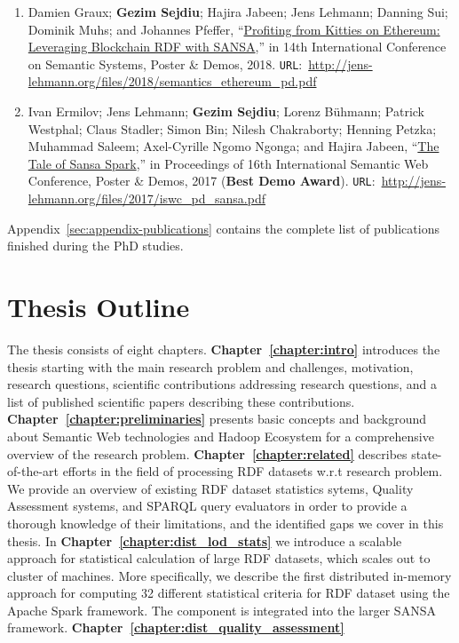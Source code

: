 \begin{itemize}
\begin{enumerate}
    \item Damien Graux; \textbf{Gezim Sejdiu}; Hajira Jabeen; Jens Lehmann; Danning Sui; Dominik Muhs; and Johannes Pfeffer, “\href{http://jens-lehmann.org/files/2018/semantics_ethereum_pd.pdf}{Profiting from Kitties on Ethereum: Leveraging Blockchain RDF with SANSA},” in 14th International Conference on Semantic Systems, Poster \& Demos, 2018. \texttt{URL}:~\url{http://jens-lehmann.org/files/2018/semantics_ethereum_pd.pdf}
    
    \item Ivan Ermilov; Jens Lehmann; \textbf{Gezim Sejdiu}; Lorenz Bühmann; Patrick Westphal; Claus Stadler; Simon Bin; Nilesh Chakraborty; Henning Petzka; Muhammad Saleem; Axel-Cyrille Ngomo Ngonga; and Hajira Jabeen, “\href{http://jens-lehmann.org/files/2017/iswc_pd_sansa.pdf}{The Tale of Sansa Spark},” in Proceedings of 16th International Semantic Web Conference, Poster \& Demos, 2017 ({\color{darkred}\textbf{Best Demo Award}}). \texttt{URL}:~\url{http://jens-lehmann.org/files/2017/iswc_pd_sansa.pdf}
        
    \end{enumerate}
\end{itemize}

Appendix~\ref{sec:appendix-publications} contains the complete list of publications finished during the PhD studies.

\section{Thesis Outline}
\label{sec:thesis-structure}
The thesis consists of eight chapters. 
\textbf{Chapter~\ref{chapter:intro}} introduces the thesis starting with the main research problem and challenges, motivation, research questions, scientific contributions addressing research questions, and a list of published scientific papers describing these contributions.
\textbf{Chapter~\ref{chapter:preliminaries}} presents basic concepts and background about Semantic Web technologies and Hadoop Ecosystem for a comprehensive overview of the research problem. 
\textbf{Chapter~\ref{chapter:related}} describes state-of-the-art efforts in the field of processing \gls{RDF} datasets w.r.t research problem.
We provide an overview of existing RDF dataset statistics sytems, Quality Assessment systems, and SPARQL query evaluators in order to provide a thorough knowledge of their limitations, and the identified gaps we cover in this thesis.
In \textbf{Chapter~\ref{chapter:dist_lod_stats}} we introduce a scalable approach for statistical calculation of large \gls{RDF} datasets, which scales out to cluster of machines.
More specifically, we describe the first distributed in-memory approach for computing 32 different statistical criteria for \gls{RDF} dataset using the Apache Spark framework.
The component is integrated into the larger SANSA framework.
\textbf{Chapter~\ref{chapter:dist_quality_assessment}} 
